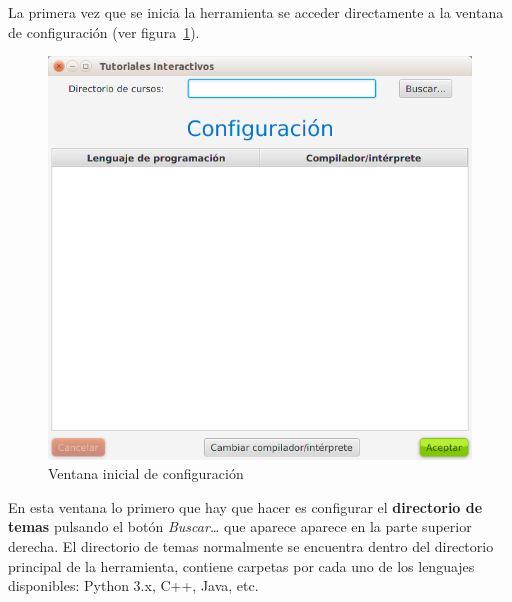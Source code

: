 \documentclass[]{article}
\begin{document}
La primera vez que se inicia la herramienta se acceder directamente a la ventana de configuración (ver figura~\ref{fig:config1}).
%
\begin{figure}[tbp]
	\begin{center}
		\includegraphics[scale=0.4]{Configuracion_vacia.png}
	\end{center}
	\caption{Ventana inicial de configuración\label{fig:config1}}
\end{figure}
%
En esta ventana lo primero que hay que hacer es configurar el \textbf{directorio de temas} pulsando el botón \emph{Buscar\ldots} que aparece aparece en la parte superior derecha. El directorio de temas normalmente se encuentra dentro del directorio principal de la herramienta, contiene carpetas por cada uno de los lenguajes disponibles: Python 3.x, C++, Java, etc. 
\end{document}
